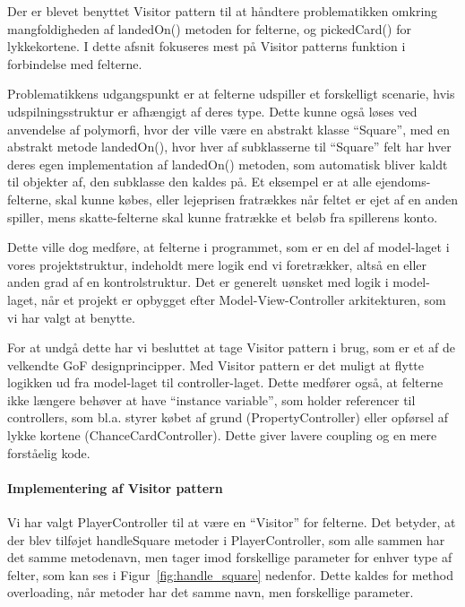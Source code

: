 \documentclass[class=article, crop=false]{standalone}
\begin{document}
\label{sec:visitor}
        Der er blevet benyttet Visitor pattern til at håndtere problematikken omkring mangfoldigheden af landedOn() metoden for felterne, og pickedCard() for lykkekortene. I dette afsnit fokuseres mest på Visitor patterns funktion i forbindelse med felterne. \par
        Problematikkens udgangspunkt er at felterne udspiller et forskelligt scenarie, hvis udspilningsstruktur er afhængigt af deres type. Dette kunne også løses ved anvendelse af polymorfi, hvor der ville være en abstrakt klasse “Square”, med en abstrakt metode landedOn(), hvor hver af subklasserne til “Square” felt har hver deres egen implementation af landedOn() metoden, som automatisk bliver kaldt til objekter af, den subklasse den kaldes på. Et eksempel er at alle ejendoms-felterne, skal kunne købes, eller lejeprisen fratrækkes når feltet er ejet af en anden spiller, mens skatte-felterne skal kunne fratrække et beløb fra spillerens konto. \par
        Dette ville dog medføre, at felterne i programmet, som er en del af model-laget i vores projektstruktur, indeholdt mere logik end vi foretrækker, altså en eller anden grad af en kontrolstruktur. Det er generelt uønsket med logik i model-laget, når et projekt er opbygget efter Model-View-Controller arkitekturen, som vi har valgt at benytte. \par
        For at undgå dette har vi besluttet at tage Visitor pattern i brug, som er et af de velkendte GoF designprincipper. Med Visitor pattern er det muligt at flytte logikken ud fra model-laget til controller-laget. Dette medfører også, at felterne ikke længere behøver at have “instance variable”, som holder referencer til controllers, som bl.a. styrer købet af grund (PropertyController) eller opførsel af lykke kortene (ChanceCardController). Dette giver lavere coupling og en mere forståelig kode.\par
\paragraph{Implementering af Visitor pattern \newline}
        Vi har valgt PlayerController til at være en “Visitor” for felterne. Det betyder, at der blev tilføjet handleSquare metoder i PlayerController, som alle sammen har det samme metodenavn, men tager imod forskellige parameter for enhver type af felter, som kan ses i Figur~\ref{fig:handle_square} nedenfor. Dette kaldes for method overloading, når metoder har det samme navn, men forskellige parameter.
\end{document}
